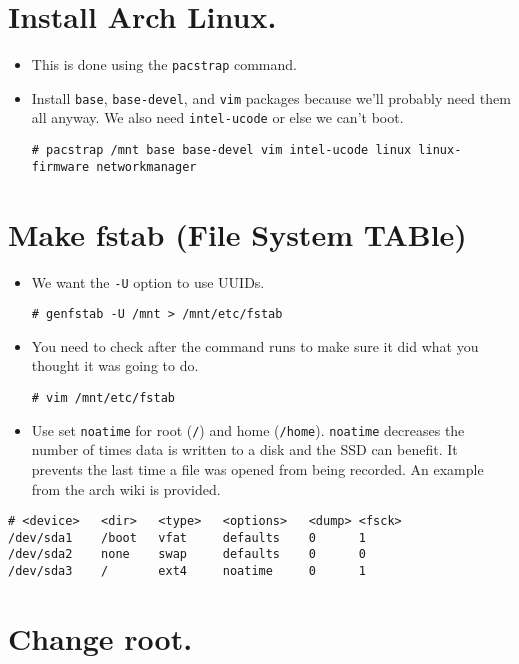 \documentclass{article}
\begin{document}
\section{Install Arch Linux.}

\begin{itemize}
  \item This is done using the \verb|pacstrap| command.
  \item Install \verb|base|, \verb|base-devel|, and \verb|vim| packages because we'll probably need them all anyway.
    We also need \verb|intel-ucode| or else we can't boot.
\begin{verbatim}
# pacstrap /mnt base base-devel vim intel-ucode linux linux-firmware networkmanager
\end{verbatim}
\end{itemize}

\section{Make fstab (File System TABle)}

\begin{itemize}
  \item We want the \verb|-U| option to use UUIDs.
\begin{verbatim}
# genfstab -U /mnt > /mnt/etc/fstab
\end{verbatim}
  \item You need to check after the command runs to make sure it did what you thought it was going to do.
\begin{verbatim}
# vim /mnt/etc/fstab
\end{verbatim}
  \item Use set \verb|noatime| for root (\verb|/|) and home (\verb|/home|).
    \verb|noatime| decreases the number of times data is written to a disk and the SSD can benefit.
    It prevents the last time a file was opened from being recorded.
    An example from the arch wiki is provided.
\end{itemize}
\begin{verbatim}
# <device>   <dir>   <type>   <options>   <dump> <fsck>
/dev/sda1    /boot   vfat     defaults    0      1
/dev/sda2    none    swap     defaults    0      0
/dev/sda3    /       ext4     noatime     0      1
\end{verbatim}

\section{Change root.}
\end{document}
